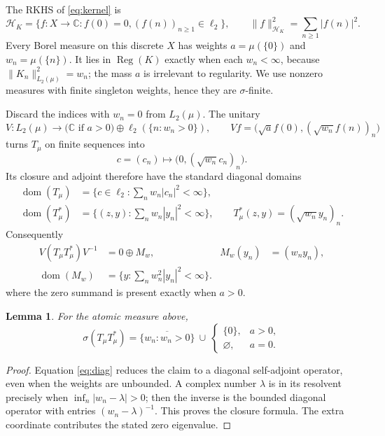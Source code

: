 \documentclass[11pt]{article}
\newtheorem{lemma}[theorem]{Lemma}
\newcommand{\Reg}{\operatorname{Reg}}
\begin{document}
The RKHS of \eqref{eq:kernel} is
\[
 \mathcal H_K=\{f:X\to\mathbb C:f(0)=0, (f(n))_{n\ge1}\in\ell_2\},
 \qquad \|f\|_{\mathcal H_K}^2=\sum_{n\ge1}|f(n)|^2.
\]
Every Borel measure on this discrete $X$ has weights
$a=\mu(\{0\})$ and $w_n=\mu(\{n\})$.  It lies in $\Reg(K)$ exactly when
each $w_n<\infty$, because $\|K_n\|_{L_2(\mu)}^2=w_n$; the mass $a$ is
irrelevant to regularity.  We use nonzero measures with finite singleton
weights, hence they are $\sigma$-finite.

Discard the indices with $w_n=0$ from $L_2(\mu)$.  The unitary
\[
 V:L_2(\mu)\longrightarrow
   \bigl(\mathbb C\text{ if }a>0\bigr)\oplus\ell_2(\{n:w_n>0\}),
 \qquad
 Vf=\bigl(\sqrt a f(0),(\sqrt{w_n}f(n))_n\bigr)
\]
turns $T_\mu$ on finite sequences into
\[
 c=(c_n)\longmapsto \bigl(0,(\sqrt{w_n}c_n)_n\bigr).
\]
Its closure and adjoint therefore have the standard diagonal domains
\begin{align*}
 \operatorname{dom}(T_\mu)
   &=\{c\in\ell_2:\sum_n w_n|c_n|^2<\infty\},\\
 \operatorname{dom}(T_\mu^*)
   &=\{(z,y):\sum_n w_n|y_n|^2<\infty\},
 \qquad T_\mu^*(z,y)=(\sqrt{w_n}y_n)_n.
\end{align*}
Consequently
\begin{equation}\label{eq:diag}
 \begin{aligned}
 V(T_\mu T_\mu^*)V^{-1}&=0\oplus M_w,
 &M_w(y_n)&=(w_ny_n),\\
 \operatorname{dom}(M_w)&=\{y:\sum_nw_n^2|y_n|^2<\infty\}.
 \end{aligned}
\end{equation}
where the zero summand is present exactly when $a>0$.

\begin{lemma}\label{lem:spectrum}
For the atomic measure above,
\[
 \sigma(T_\mu T_\mu^*)=
 \overline{\{w_n:w_n>0\}}\ \cup\
 \begin{cases}\{0\},&a>0,\\ \varnothing,&a=0.\end{cases}
\]
\end{lemma}
\begin{proof}
Equation \eqref{eq:diag} reduces the claim to a diagonal self-adjoint
operator, even when the weights are unbounded.  A complex number $\lambda$
is in its resolvent precisely when
$\inf_n|w_n-\lambda|>0$; then the inverse is the bounded diagonal operator
with entries $(w_n-\lambda)^{-1}$.  This proves the closure formula.  The
extra coordinate contributes the stated zero eigenvalue.
\end{proof}
\end{document}
